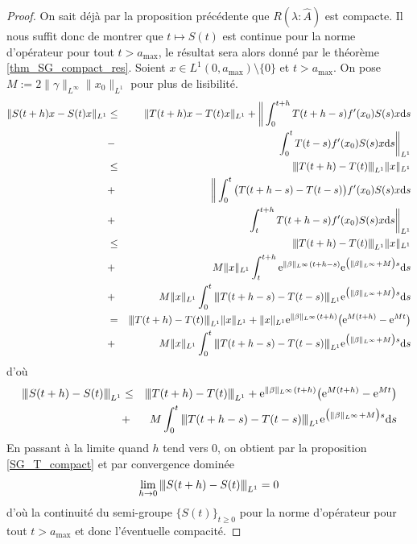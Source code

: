 \begin{proof}
    On sait déjà par la proposition précédente que $R(\lambda : \hat{A})$ est compacte. Il nous suffit donc de montrer que $t \mapsto S(t)$ est continue pour la norme d'opérateur pour tout $t > a_{\max}$, le résultat sera alors donné par le théorème \ref{thm_SG_compact_res}. Soient $x \in L^1(0,a_{\max}) \setminus \{0\}$ et $t >a_{\max}$. On pose $M:=2\|\gamma\|_{L^\infty}\|x_0\|_{L^1}$ pour plus de lisibilité.
    \begin{eqnarray*}
        \|S(t+h)x-S(t)x\|_{L^1} &\leq& \|T(t+h)x-T(t)x\|_{L^1}+\bigg\|\int_0^{t+h}T(t+h-s)f'(x_0)S(s)x\d s \\
        &-& \int_0^t T(t-s)f'(x_0)S(s)x\d s\bigg\|_{L^1} \\
        &\leq& \vertiii{T(t+h)-T(t)}_{L^1}\|x\|_{L^1} \\
        &+& \bigg\| \int_0^t \big(T(t+h-s)-T(t-s)\big)f'(x_0)S(s)x\d s \\
        &+& \int_t^{t+h}T(t+h-s)f'(x_0)S(s)x\d s \bigg\|_{L^1} \\
        &\leq& \vertiii{T(t+h)-T(t)}_{L^1}\|x\|_{L^1}\\
        &+& M\|x\|_{L^1}\int_t^{t+h}\ex^{\|\beta\|_{L^\infty}(t+h-s)}\ex^{\big(\|\beta\|_{L^\infty}+M\big)s}\d s \\
        &+&M\|x\|_{L^1}\int_0^t\vertiii{T(t+h-s)-T(t-s)}_{L^1}\ex^{\big(\|\beta\|_{L^\infty}+M\big)s}\d s \\
        &=& \vertiii{T(t+h)-T(t)}_{L^1}\|x\|_{L^1} + \|x\|_{L^1}\ex^{\|\beta\|_{L^\infty}(t+h)}\big(\ex^{M(t+h)}-\ex^{Mt}\big) \\
        &+&M\|x\|_{L^1}\int_0^t\vertiii{T(t+h-s)-T(t-s)}_{L^1}\ex^{\big(\|\beta\|_{L^\infty}+M\big)s}\d s
    \end{eqnarray*}
    d'où 
    \begin{eqnarray*}
        {\left\vert\kern-0.25ex\left\vert \kern-0.25ex\left\vert S(t+h)-S(t) \right\vert\kern-0.25ex\right\vert\kern-0.25ex\right\vert}_{L^1} &\leq& {\left\vert\kern-0.25ex\left\vert \kern-0.25ex\left\vert T(t+h)-T(t) \right\vert\kern-0.25ex\right\vert\kern-0.25ex\right\vert}_{L^1} + \mathrm{e}^{\|\beta\|_{L^\infty}(t+h)}\big(\mathrm{e}^{M(t+h)}-\mathrm{e}^{Mt}\big) \\
        &+& M \int_0^t{\left\vert\kern-0.25ex\left\vert \kern-0.25ex\left\vert T(t+h-s)-T(t-s) \right\vert\kern-0.25ex\right\vert\kern-0.25ex\right\vert}_{L^1}\mathrm{e}^{\big(\|\beta\|_{L^\infty}+M\big)s}\mathrm{d} s
    \end{eqnarray*}
    En passant à la limite quand $h$ tend vers $0$, on obtient par la proposition \ref{SG_T_compact} et par convergence dominée 
    \begin{equation*}
        \lim_{h \to 0} {\left\vert\kern-0.25ex\left\vert \kern-0.25ex\left\vert S(t+h)-S(t) \right\vert\kern-0.25ex\right\vert\kern-0.25ex\right\vert}_{L^1} = 0
    \end{equation*}
    d'où la continuité du semi-groupe $\big\{S(t)\big\}_{t \geq 0}$ pour la norme d'opérateur pour tout $t >a_{\max}$ et donc l'éventuelle compacité.
\end{proof}

